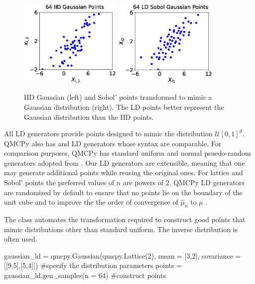 \documentclass[11pt]{NSFamsart}
\newcommand{\calu}{{\mathcal{U}}}
\newcommand{\hmu}{\hat{\mu}}
\begin{document}
\begin{figure}
	\centering
	\includegraphics[height = 4.2cm]{ProgramsImages/Gauss_IID.eps}
	\includegraphics[height = 4.2cm]{ProgramsImages/Gauss_Sobol.eps}
	\caption{IID Gaussian (left) and Sobol'  points transformed to mimic a Gaussian distribution (right).  The LD points better represent the Gaussian distribution than the IID points. \label{fig:ld_Gauss}}
\end{figure}

All LD generators provide points designed to mimic the distribution $\calu[0,1]^d$.  QMCPy also has  \cite{DicPil10a} and  \cite{Hal60} LD generators whose syntax are comparable.
For comparison purposes, QMCPy  has standard uniform and normal psuedo-random generators adopted from .  Our LD generators are extensible, meaning that one may generate additional points while reusing the original ones.  For lattice and Sobol' points the preferred values of $n$ are powers of $2$.  QMCPy LD generators are randomized by default to ensure that no points lie on the boundary of the unit cube and to improve the the order of convergence of $\hmu_n$ to $\mu$ \cite{Owe97}.

The  class automates the transformation required to construct good points that mimic distributions other than standard uniform.  The  inverse  distribution is often used.
\begin{pythoncode}
gaussian_ld = qmcpy.Gaussian(qmcpy.Lattice(2), mean = [3,2], covariance = [[9,5],[5,4]])  #specify the distribution parameters
points = gaussian_ld.gen_samples(n = 64)  #construct points
\end{pythoncode}
\end{document}
